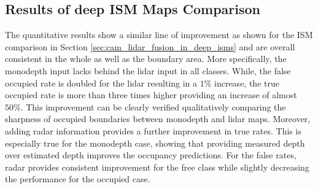 \subsection{Results of deep ISM Maps Comparison}
\label{subsec:results_analyze_deep_ism_maps_diff_sensors}
The quantitative results show a similar line of improvement as shown for the ISM comparison in Section \ref{sec:cam_lidar_fusion_in_deep_isms} and are overall consistent in the whole as well as the boundary area. More specifically, the \gls{monodepth} input lacks behind the lidar input in all classes. While, the false occupied rate is doubled for the lidar resulting in a $1\%$ increase, the true occupied rate is more than three times higher providing an increase of almost $50\%$. This improvement can be clearly verified qualitatively comparing the sharpness of occupied boundaries between \gls{monodepth} and lidar maps. Moreover, adding radar information provides a further improvement in true rates. This is especially true for the \gls{monodepth} case, showing that providing measured depth over estimated depth improves the occupancy predictions. For the false rates, radar provides consistent improvement for the free class while slightly decreasing the performance for the occupied case.
